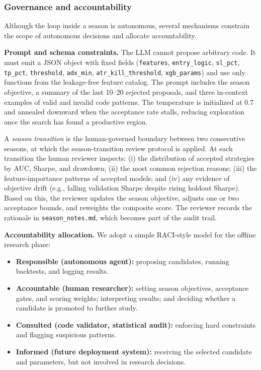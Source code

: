 \documentclass[analytics,article,submit,pdftex,moreauthors]{Definitions/mdpi}
\begin{document}
\subsubsection{Governance and accountability}\label{governance-and-accountability}

Although the loop inside a season is autonomous, several mechanisms constrain the scope of autonomous decisions and allocate accountability.

\textbf{Prompt and schema constraints.} The LLM cannot propose arbitrary code. It must emit a JSON object with fixed fields (\texttt{features}, \texttt{entry\_logic}, \texttt{sl\_pct}, \texttt{tp\_pct}, \texttt{threshold}, \texttt{adx\_min}, \texttt{atr\_kill\_threshold}, \texttt{xgb\_params}) and use only functions from the leakage-free feature catalog. The prompt includes the season objective, a summary of the last 10--20 rejected proposals, and three in-context examples of valid and invalid code patterns. The temperature is initialized at 0.7 and annealed downward when the acceptance rate stalls, reducing exploration once the search has found a productive region.

\begin{Definition}\label{def:season-transition}
A \emph{season transition} is the human-governed boundary between two consecutive seasons, at which the season-transition review protocol is applied. At each transition the human reviewer inspects: (i) the distribution of accepted strategies by AUC, Sharpe, and drawdown; (ii) the most common rejection reasons; (iii) the feature-importance patterns of accepted models; and (iv) any evidence of objective drift (e.g., falling validation Sharpe despite rising holdout Sharpe). Based on this, the reviewer updates the season objective, adjusts one or two acceptance bounds, and reweights the composite score. The reviewer records the rationale in \texttt{season\_notes.md}, which becomes part of the audit trail.
\end{Definition}

\textbf{Accountability allocation.} We adopt a simple RACI-style model for the offline research phase:

\begin{itemize}
\item
  \textbf{Responsible (autonomous agent):} proposing candidates, running backtests, and logging results.
\item
  \textbf{Accountable (human researcher):} setting season objectives, acceptance gates, and scoring weights; interpreting results; and deciding whether a candidate is promoted to further study.
\item
  \textbf{Consulted (code validator, statistical audit):} enforcing hard constraints and flagging suspicious patterns.
\item
  \textbf{Informed (future deployment system):} receiving the selected candidate and parameters, but not involved in research decisions.
\end{itemize}
\end{document}
